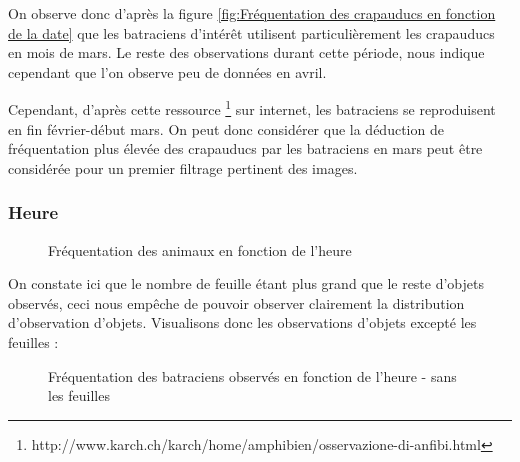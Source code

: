 \noindent On observe donc d'après la figure \ref{fig:Fréquentation des crapauducs en fonction de la date} que les batraciens d'intérêt utilisent particulièrement les crapauducs en mois de mars. Le reste des observations durant cette période, nous indique cependant que l'on observe peu de données en avril. \newline

Cependant, d'après cette ressource \footnote[1]{http://www.karch.ch/karch/home/amphibien/osservazione-di-anfibi.html} sur internet, les batraciens se reproduisent en fin février-début mars. On peut donc considérer que la déduction de fréquentation plus élevée des crapauducs par les batraciens en mars peut être considérée pour un premier filtrage pertinent des images.

\subsubsection{Heure}

\begin{figure}[H]
    \centering
    \caption{Fréquentation des animaux en fonction de l'heure}
    \label{fig:Fréquentation des objets en fonction de l'heure}
\end{figure}

On constate ici que le nombre de feuille étant plus grand que le reste d'objets observés, ceci nous empêche de pouvoir observer clairement la distribution d'observation d'objets. Visualisons donc les observations d'objets excepté les feuilles :

\begin{figure}[H]
    \centering
    \caption{Fréquentation des batraciens observés en fonction de l'heure - sans les feuilles}
    \label{fig:Fréquentation des crapauducs en fonction de l'heure - sans les feuilles}
\end{figure}

